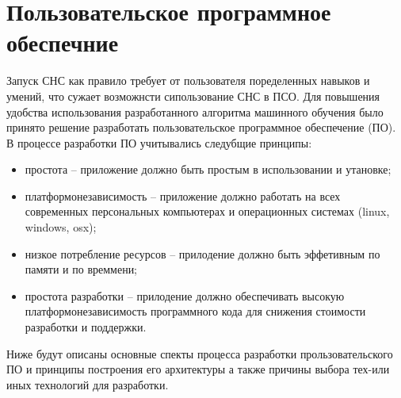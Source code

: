 \section{Пользовательское программное обеспечние}

Запуск СНС как правило требует от пользователя поределенных навыков и умений, что сужает возможнсти сипользование СНС в ПСО. Для повышения удобства использования разработанного алгоритма машинного обучения было принято решение разработать пользовательское программное обеспечение (ПО). В процессе разработки ПО учитывались следубщие принципы:
\begin{itemize}
    \item простота -- приложение должно быть простым в использовании и утановке;
    \item платформонезависимость -- приложение должно работать на всех современных персональных компьютерах и операционных системах (linux, windows, osx);
    \item низкое потребление ресурсов -- прилодение должно быть эффетивным по памяти и по времмени;
    \item простота разработки -- прилодение должно обеспечивать высокую платформонезависимость программного кода для снижения стоимости разработки и поддержки.
\end{itemize}

Ниже будут описаны основные спекты процесса разработки прользовательского ПО и принципы построения его архитектуры а также причины выбора тех-или иных технологий для разработки.




\clearpage